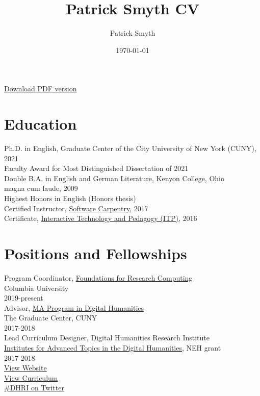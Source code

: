 \documentclass[11pt]{article}
\author{Patrick Smyth}
\date{\today}
\title{Patrick Smyth CV}
\begin{document}
\maketitle
\href{https://github.com/smythp/cv/raw/master/cv.pdf}{Download PDF version}\\
\section*{Education}
\label{sec:orgheadline1}
Ph.D. in English, Graduate Center of the City University of New York (CUNY), 2021\\
    Faculty Award for Most Distinguished Dissertation of 2021\\



Double B.A. in English and German Literature, Kenyon College, Ohio\\
        magna cum laude, 2009\\
        Highest Honors in English (Honors thesis)\\

Certified Instructor, \href{https://software-carpentry.org/about/}{Software Carpentry}, 2017\\

Certificate, \href{https://www.gc.cuny.edu/Page-Elements/Academics-Research-Centers-Initiatives/Certificate-Programs/Interactive-Technology-and-Pedagogy}{Interactive Technology and Pedagogy (ITP)}, 2016\\

\section*{Positions and Fellowships}
\label{sec:orgheadline2}

Program Coordinator, \href{https://rcfoundations.research.columbia.edu/}{Foundations for Research Computing}\\
Columbia University\\
2019-present\\

Advisor, \href{https://gc.cuny.edu/Page-Elements/Academics-Research-Centers-Initiatives/Masters-Programs/Digital-Humanities}{MA Program in Digital Humanities}\\
The Graduate Center, CUNY\\
2017-2018\\

Lead Curriculum Designer, Digital Humanities Research Institute\\
\href{https://www.neh.gov/grants/odh/institutes-advanced-topics-in-the-digital-humanities}{Institutes for Advanced Topics in the Digital Humanities}, NEH grant\\
2017-2018\\
\href{http://dhinstitutes.org}{View Website}\\
\href{https://github.com/DHRI-Curriculum}{View Curriculum}\\
\href{https://twitter.com/search?q=\%2523dhri&src=tyah}{\#DHRI on Twitter}\\
\end{document}
